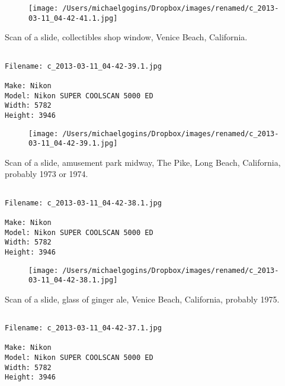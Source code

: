 \begin{figure}
\texttt{[image: /Users/michaelgogins/Dropbox/images/renamed/c\_2013-03-11\_04-42-41.1.jpg]}
\end{figure}
    
\clearpage
\onecolumn
\noindent Scan of a slide, collectibles shop window, Venice Beach, California.
\noindent
\begin{lstlisting}

Filename: c_2013-03-11_04-42-39.1.jpg

Make: Nikon
Model: Nikon SUPER COOLSCAN 5000 ED
Width: 5782
Height: 3946
\end{lstlisting}
\clearpage

\begin{figure}
\texttt{[image: /Users/michaelgogins/Dropbox/images/renamed/c\_2013-03-11\_04-42-39.1.jpg]}
\end{figure}
    
\clearpage
\onecolumn
\noindent Scan of a slide, amusement park midway, The Pike, Long Beach, California, probably 1973 or 1974.
\noindent
\begin{lstlisting}

Filename: c_2013-03-11_04-42-38.1.jpg

Make: Nikon
Model: Nikon SUPER COOLSCAN 5000 ED
Width: 5782
Height: 3946
\end{lstlisting}
\clearpage

\begin{figure}
\texttt{[image: /Users/michaelgogins/Dropbox/images/renamed/c\_2013-03-11\_04-42-38.1.jpg]}
\end{figure}
    
\clearpage
\onecolumn
\noindent Scan of a slide, glass of ginger ale, Venice Beach, California, probably 1975.
\noindent
\begin{lstlisting}

Filename: c_2013-03-11_04-42-37.1.jpg

Make: Nikon
Model: Nikon SUPER COOLSCAN 5000 ED
Width: 5782
Height: 3946
\end{lstlisting}
\clearpage

